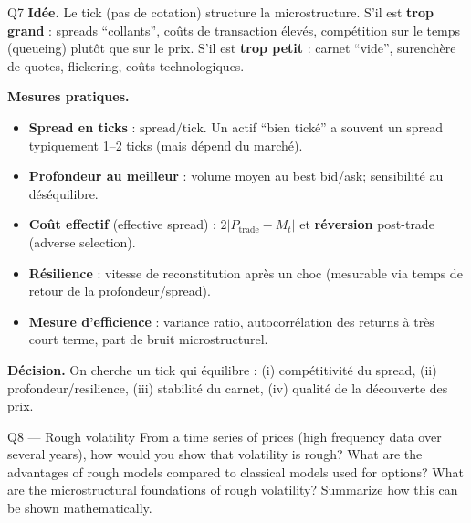 \begin{solutionbox}{Q7}
\textbf{Idée.} Le tick (pas de cotation) structure la microstructure. S'il est \textbf{trop grand} : spreads ``collants'', coûts de transaction élevés, compétition sur le temps (queueing) plutôt que sur le prix. S'il est \textbf{trop petit} : carnet ``vide'', surenchère de quotes, flickering, coûts technologiques.

\medskip
\textbf{Mesures pratiques.}
\begin{itemize}[leftmargin=*]
  \item \textbf{Spread en ticks} : $\text{spread}/\text{tick}$. Un actif ``bien tické'' a souvent un spread typiquement 1--2 ticks (mais dépend du marché).
  \item \textbf{Profondeur au meilleur} : volume moyen au best bid/ask; sensibilité au déséquilibre.
  \item \textbf{Coût effectif} (effective spread) : $2|P_{\text{trade}}-M_t|$ et \textbf{réversion} post-trade (adverse selection).
  \item \textbf{Résilience} : vitesse de reconstitution après un choc (mesurable via temps de retour de la profondeur/spread).
  \item \textbf{Mesure d'efficience} : variance ratio, autocorrélation des returns à très court terme, part de bruit microstructurel.
\end{itemize}

\medskip
\textbf{Décision.} On cherche un tick qui équilibre : (i) compétitivité du spread, (ii) profondeur/resilience, (iii) stabilité du carnet, (iv) qualité de la découverte des prix.
\end{solutionbox}

\begin{questionbox}{Q8 --- Rough volatility}
From a time series of prices (high frequency data over several years), how would you show that volatility is rough? What are the advantages of rough models compared to classical models used for options? What are the microstructural foundations of rough volatility? Summarize how this can be shown mathematically.
\end{questionbox}


